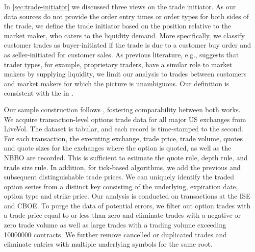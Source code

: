 In \cref{sec:trade-initiator} we discussed three views on the trade initiator. As our data sources do not provide the order entry times or order types for both sides of the trade, we define the trade initiator based on the position relative to the market maker, who caters to the liquidity demand. More specifically, we classify customer trades as buyer-initiated if the trade is due to a customer buy order and as seller-initiated for customer sales. As previous literature, e.g., \textcite[][4276]{garleanuDemandBasedOptionPricing2009} suggests that trader types, for example, proprietary traders, have a similar role to market makers by supplying liquidity, we limit our analysis to trades between customers and market makers for which the picture is unambiguous. Our definition is consistent with the in \textcite[][8]{grauerOptionTradeClassification2022}.


Our sample construction follows \textcite[][7--9]{grauerOptionTradeClassification2022}, fostering comparability between both works. We acquire transaction-level options trade data for all major US exchanges from LiveVol. The dataset is tabular, and each record is time-stamped to the second. For each transaction, the executing exchange, trade price, trade volume, quotes and quote sizes for the exchanges where the option is quoted, as well as the \gls{NBBO} are recorded. This is sufficient to estimate the quote rule, depth rule, and trade size rule. In addition, for tick-based algorithms, we add the previous and subsequent distinguishable trade prices. We can uniquely identify the traded option series from a distinct key consisting of the underlying, expiration date, option type and strike price. Our analysis is conducted on transactions at the \gls{ISE} and \gls{CBOE}. To purge the data of potential errors, we filter out option trades with a trade price equal to or less than zero and eliminate trades with a negative or zero trade volume as well as large trades with a trading volume exceeding \num{10000000} contracts. We further remove cancelled or duplicated trades and eliminate entries with multiple underlying symbols for the same root.

